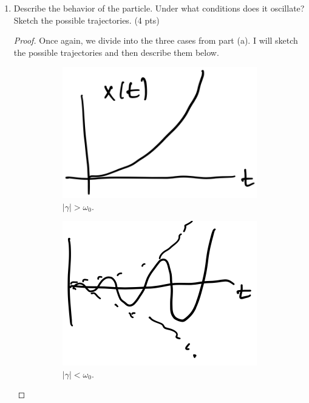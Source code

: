 \documentclass[../psets.tex]{subfiles}
\begin{document}
\begin{enumerate}
\begin{enumerate}
        \item Describe the behavior of the particle. Under what conditions does it oscillate? Sketch the possible trajectories. (4 pts)
        \begin{proof}
            Once again, we divide into the three cases from part (a). I will sketch the possible trajectories and then describe them below.
            \begin{figure}[H]
                \centering
                \begin{subfigure}[b]{0.3\linewidth}
                    \centering
                    \includegraphics[width=0.8\linewidth]{../ExtFiles/PSet1-Q4b-a.png}
                    \caption{$|\gamma|>\omega_0$.}
                \end{subfigure}
                \begin{subfigure}[b]{0.3\linewidth}
                    \centering
                    \includegraphics[width=0.8\linewidth]{../ExtFiles/PSet1-Q4b-b.png}
                    \caption{$|\gamma|<\omega_0$.}
                \end{subfigure}
                \begin{subfigure}[b]{0.3\linewidth}

\end{subfigure}
\end{figure}
\end{proof}
\end{enumerate}
\end{enumerate}
\end{document}
